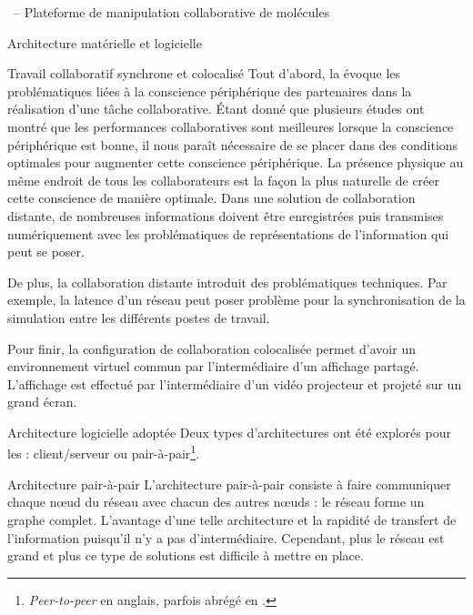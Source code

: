 \documentclass[myfrancais,ngerman,english,french]{mythesis}
\begin{document}
\begin{mychapter}{\myShaddock\ -- Plateforme de manipulation collaborative de molécules}
\begin{mysection}{Architecture matérielle et logicielle}
\begin{mysubsection}{Travail collaboratif synchrone et colocalisé}
				Tout d'abord, la  évoque les problématiques liées à la conscience périphérique des partenaires dans la réalisation d'une tâche collaborative.
				Étant donné que plusieurs études ont montré que les performances collaboratives sont meilleures lorsque la conscience périphérique est bonne, il nous paraît nécessaire de se placer dans des conditions optimales pour augmenter cette conscience périphérique.
				La présence physique au même endroit de tous les collaborateurs est la façon la plus naturelle de créer cette conscience de manière optimale.
				Dans une solution de collaboration distante, de nombreuses informations doivent être enregistrées puis transmises numériquement avec les problématiques de représentations de l'information qui peut se poser.

				De plus, la collaboration distante introduit des problématiques techniques.
				Par exemple, la latence d'un réseau peut poser problème pour la synchronisation de la simulation entre les différents postes de travail.

				Pour finir, la configuration de collaboration colocalisée permet d'avoir un environnement virtuel commun par l'intermédiaire d'un affichage partagé.
				L'affichage est effectué par l'intermédiaire d'un vidéo projecteur et projeté sur un grand écran.
			\end{mysubsection}
			\begin{mysubsection}{Architecture logicielle adoptée}
				Deux types d'architectures ont été explorés pour les  : client/serveur ou pair-à-pair\footnote{\textit{Peer-to-peer} en anglais, parfois abrégé en \myPtwoP.}.
				\begin{mysubsubsection}{Architecture pair-à-pair}
					L'architecture pair-à-pair consiste à faire communiquer chaque nœud du réseau avec chacun des autres nœuds : le réseau forme un graphe complet.
					L'avantage d'une telle architecture et la rapidité de transfert de l'information puisqu'il n'y a pas d'intermédiaire.
					Cependant, plus le réseau est grand et plus ce type de solutions est difficile à mettre en place.


\end{mysubsubsection}
\end{mysubsection}
\end{mysection}
\end{mychapter}
\end{document}
